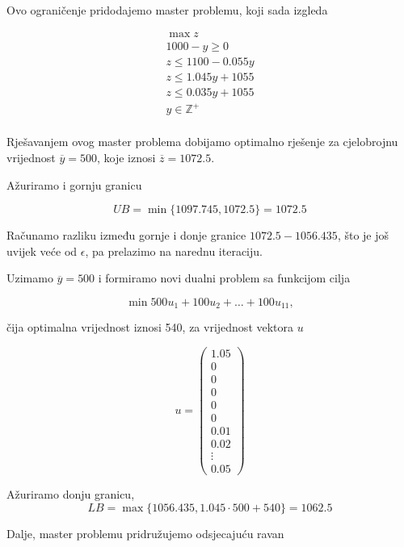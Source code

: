 \documentclass[a4paper, utf8, 11pt, colorlinks]{book}
\begin{document}
Ovo ograničenje pridodajemo master problemu, koji sada izgleda


$$
\begin{aligned}
	\max z\\
	1000-y\geqslant 0\\
	z\leqslant 1100-0.055y\\ 
	z\leqslant 1.045y+1055\\
	z\leqslant 0.035y+1055\\
	y\in\mathbb{Z}^+\\	
\end{aligned}
$$

Rješavanjem ovog master problema dobijamo optimalno rješenje 
 za cjelobrojnu vrijednost $\overline{y}=500$, koje iznosi $\overline{z} = 1072.5$.
 
 Ažuriramo i gornju granicu

$$UB = \min\{1097.745, 1072.5\} =  1072.5$$

Računamo razliku između gornje i donje granice $1072.5-1056.435$, što je još uvijek veće od $\epsilon$, pa prelazimo na narednu iteraciju.

Uzimamo 
$\overline{y}=500$ i formiramo novi dualni problem sa funkcijom cilja

$$\min 500u_1+ 100u_2+\ldots+100u_{11},$$

čija optimalna vrijednost iznosi 540, za vrijednost vektora $u$

$$u=\left(\begin{array}{c}
	1.05\\
	0\\
	0\\
	0\\
	0\\
	0\\
	0.01 \\
	0.02 \\
	\vdots \\
	0.05
\end{array}\right)$$

Ažuriramo donju granicu,
$$LB = \max\{1056.435, 1.045\cdot 500+540\} =1062.5 $$




Dalje, master problemu pridružujemo odsjecajuću ravan
 
\end{document}
